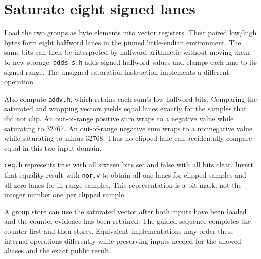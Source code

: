 \section{Saturate eight signed lanes}\label{pcm-vector}
Load the two groups as byte elements into vector registers. Their paired low/high
bytes form eight halfword lanes in the pinned little-endian environment. The same
bits can then be interpreted by halfword arithmetic without moving them to new
storage. \texttt{adds\_s.h} adds signed halfword values and clamps each lane to its
signed range. The unsigned saturation instruction implements a different operation.

Also compute \texttt{addv.h}, which retains each sum's low halfword bits. Comparing
the saturated and wrapping vectors yields equal lanes exactly for the samples that
did not clip. An out-of-range positive sum wraps to a negative value while saturating
to 32767. An out-of-range negative sum wraps to a nonnegative value while saturating
to minus 32768. Thus no clipped lane can accidentally compare equal in this two-input
domain.

\texttt{ceq.h} represents true with all sixteen bits set and false with all bits
clear. Invert that equality result with \texttt{nor.v} to obtain all-one lanes for
clipped samples and all-zero lanes for in-range samples. This representation is a
bit mask, not the integer number one per clipped sample.

A group store can use the saturated vector after both inputs have been loaded and
the counter evidence has been retained. The guided sequence completes the counter
first and then stores. Equivalent implementations may order these internal operations
differently while preserving inputs needed for the allowed aliases and the exact
public result.
